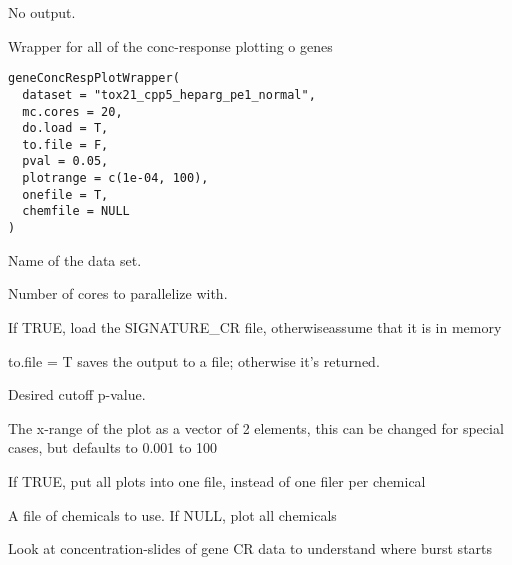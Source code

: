 \documentclass[letterpaper]{book}
\begin{document}
%
\begin{Value}
No output.
\end{Value}
%
\begin{Description}\relax
Wrapper for all of the conc-response plotting o genes
\end{Description}
%
\begin{Usage}
\begin{verbatim}
geneConcRespPlotWrapper(
  dataset = "tox21_cpp5_heparg_pe1_normal",
  mc.cores = 20,
  do.load = T,
  to.file = F,
  pval = 0.05,
  plotrange = c(1e-04, 100),
  onefile = T,
  chemfile = NULL
)
\end{verbatim}
\end{Usage}
%
\begin{Arguments}
\begin{ldescription}
\item[\code{dataset}] Name of the data set.

\item[\code{mc.cores}] Number of cores to parallelize with.

\item[\code{do.load}] If TRUE, load the SIGNATURE\_CR file, otherwiseassume that it is in memory

\item[\code{to.file}] to.file = T saves the output to a file; otherwise it's returned.

\item[\code{pval}] Desired cutoff p-value.

\item[\code{plotrange}] The x-range of the plot as a vector of 2 elements, this can be changed for special cases, but defaults to 0.001 to 100

\item[\code{onefile}] If TRUE, put all plots into one file, instead of one filer per chemical

\item[\code{chemfile}] A file of chemicals to use. If NULL, plot all chemicals
\end{ldescription}
\end{Arguments}
%
\begin{Description}\relax
Look at concentration-slides of gene CR data to understand where burst starts
\end{Description}
\end{document}
